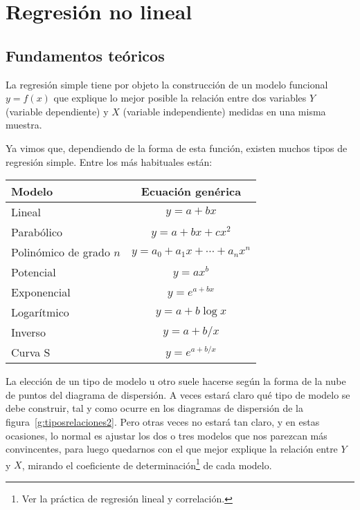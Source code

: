 
\chapter{Regresión no lineal}

\section{Fundamentos teóricos}
La regresión simple tiene por objeto la construcción de un modelo funcional $y=f(x)$ que explique lo mejor posible la
relación entre dos variables $Y$ (variable dependiente) y $X$ (variable independiente) medidas en una misma muestra.

Ya vimos que, dependiendo de la forma de esta función, existen muchos tipos de regresión simple. 
Entre los más habituales están:
\begin{center}
\begin{tabular}{|l|c|}
\hline
 Modelo      &     Ecuación genérica      \\
\hline\hline
 Lineal                  &          $y=a+bx$          \\
\hline
 Parabólico              &       $y=a+bx+cx^2$        \\
\hline
 Polinómico de grado $n$ & $y=a_0+a_1x+\cdots+a_nx^n$ \\
\hline
 Potencial               &       $y=ax^b$       \\
\hline
 Exponencial             &     $y=e^{a+bx}$      \\
\hline
 Logarítmico             &       $y=a+b\log x$        \\
\hline
Inverso & $y=a+b/x$ \\
\hline
Curva S & $y= e^{a+b/x}$ \\
\hline
\end{tabular}
\end{center}

La elección de un tipo de modelo u otro suele hacerse según la forma de la nube de puntos del diagrama de dispersión.
A veces estará claro qué tipo de modelo se debe construir, tal y como ocurre en los diagramas de dispersión de la
figura~\ref{g:tiposrelaciones2}.
Pero otras veces no estará tan claro, y en estas ocasiones, lo normal es ajustar los dos o tres modelos que nos parezcan
más convincentes, para luego quedarnos con el que mejor explique la relación entre $Y$ y $X$, mirando el coeficiente de
determinación\footnote{Ver la práctica de regresión lineal y correlación.} de cada modelo.

